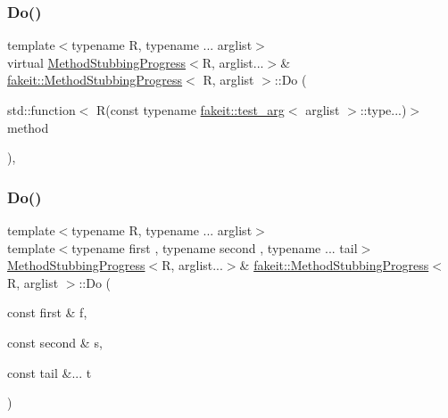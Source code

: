 \mbox{\label{structfakeit_1_1MethodStubbingProgress_a9ef4c2db8e567aa312b708613d240ae1}} 
\subsubsection{\texorpdfstring{Do()}{Do()}\hspace{0.1cm}{\footnotesize\ttfamily [7/27]}}
{\footnotesize\ttfamily template$<$typename R, typename ... arglist$>$ \\
virtual \mbox{\hyperlink{structfakeit_1_1MethodStubbingProgress}{Method\+Stubbing\+Progress}}$<$R, arglist...$>$\& \mbox{\hyperlink{structfakeit_1_1MethodStubbingProgress}{fakeit\+::\+Method\+Stubbing\+Progress}}$<$ R, arglist $>$\+::Do (\begin{DoxyParamCaption}\item[{std\+::function$<$ R(const typename \mbox{\hyperlink{structfakeit_1_1test__arg}{fakeit\+::test\+\_\+arg}}$<$ arglist $>$\+::type...)$>$}]{method }\end{DoxyParamCaption})\hspace{0.3cm}{\ttfamily [inline]}, {\ttfamily [virtual]}}

\mbox{\label{structfakeit_1_1MethodStubbingProgress_a157561400e37da65c5b48f4466fc603c}} 
\subsubsection{\texorpdfstring{Do()}{Do()}\hspace{0.1cm}{\footnotesize\ttfamily [8/27]}}
{\footnotesize\ttfamily template$<$typename R, typename ... arglist$>$ \\
template$<$typename first , typename second , typename ... tail$>$ \\
\mbox{\hyperlink{structfakeit_1_1MethodStubbingProgress}{Method\+Stubbing\+Progress}}$<$R, arglist...$>$\& \mbox{\hyperlink{structfakeit_1_1MethodStubbingProgress}{fakeit\+::\+Method\+Stubbing\+Progress}}$<$ R, arglist $>$\+::Do (\begin{DoxyParamCaption}\item[{const first \&}]{f,  }\item[{const second \&}]{s,  }\item[{const tail \&...}]{t }\end{DoxyParamCaption})\hspace{0.3cm}{\ttfamily [inline]}}

